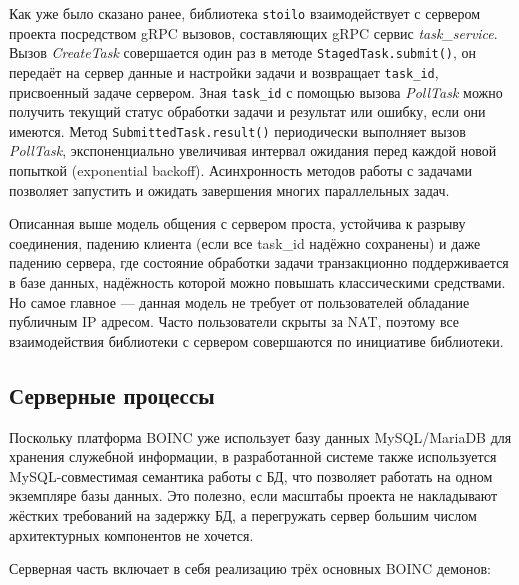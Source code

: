 \documentclass[a4paper,12pt]{extarticle}
\begin{document}
Как уже было сказано ранее, библиотека \texttt{stoilo} взаимодействует с сервером проекта посредством gRPC вызовов, составляющих gRPC сервис \textit{task\_service}. Вызов \textit{CreateTask} совершается один раз в методе \texttt{StagedTask.submit()}, он передаёт на сервер данные и настройки задачи и возвращает \texttt{task\_id}, присвоенный задаче сервером. Зная \texttt{task\_id} с помощью вызова \textit{PollTask} можно получить текущий статус обработки задачи и результат или ошибку, если они имеются. Метод \texttt{SubmittedTask.result()} периодически выполняет вызов \textit{PollTask}, экспоненциально увеличивая интервал ожидания перед каждой новой попыткой (exponential backoff). Асинхронность методов работы с задачами позволяет запустить и ожидать завершения многих параллельных задач.

Описанная выше модель общения с сервером проста, устойчива к разрыву соединения, падению клиента (если все task\_id надёжно сохранены) и даже падению сервера, где состояние обработки задачи транзакционно поддерживается в базе данных, надёжность которой можно повышать классическими средствами. Но самое главное — данная модель не требует от пользователей обладание публичным IP адресом. Часто пользователи скрыты за NAT, поэтому все взаимодействия библиотеки с сервером совершаются по инициативе библиотеки.

\subsection{Серверные процессы}

Поскольку платформа BOINC уже использует базу данных MySQL/MariaDB для хранения служебной информации, в разработанной системе также используется MySQL-совместимая семантика работы с БД, что позволяет работать на одном экземпляре базы данных. Это полезно, если масштабы проекта не накладывают жёстких требований на задержку БД, а перегружать сервер большим числом архитектурных компонентов не хочется.

Серверная часть включает в себя реализацию трёх основных BOINC демонов:
\end{document}
